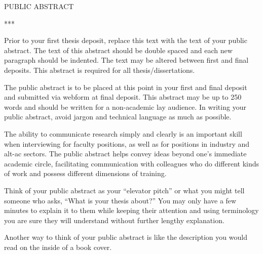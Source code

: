 \begin{doublespace}
\begin{tightcenter}
PUBLIC ABSTRACT
\mylinespacing
\end{tightcenter}
***

Prior to your first thesis deposit, replace this text with the text of your public abstract. The text of this abstract should be double spaced and each new paragraph should be indented. The text may be altered between first and final deposits. This abstract is required for all thesis/dissertations. 

The public abstract is to be placed at this point in your first and final deposit and submitted via webform at final deposit. This abstract may be up to 250 words and should be written for a non-academic lay audience. In writing your public abstract, avoid jargon and technical language as much as possible. 

The ability to communicate research simply and clearly is an important skill when interviewing for faculty positions, as well as for positions in industry and alt-ac sectors. The public abstract helps convey ideas beyond one’s immediate academic circle, facilitating communication with colleagues who do different kinds of work and possess different dimensions of training.

Think of your public abstract as your “elevator pitch” or what you might tell someone who asks, “What is your thesis about?” You may only have a few minutes to explain it to them while keeping their attention and using terminology you are sure they will understand without further lengthy explanation.

Another way to think of your public abstract is like the description you would read on the inside of a book cover.

\end{doublespace}
